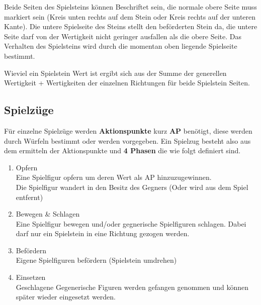 \documentclass{article}
\begin{document}
    \begin{flushleft}
    
    Beide Seiten des Spielsteins können Beschriftet sein, die normale obere Seite muss 
    markiert sein (Kreis unten rechts auf dem Stein oder Kreis rechts auf der unteren Kante).
	Die untere Spielseite des Steins stellt den beförderten Stein da, die untere Seite darf 
	von der Wertigkeit nicht geringer ausfallen als die obere Seite.
	Das Verhalten des Spielsteins wird durch die momentan oben liegende Spielseite bestimmt.
	
	
	Wieviel ein Spielstein Wert ist ergibt sich aus der Summe der generellen Wertigkeit + Wertigkeiten der einzelnen Richtungen für beide Spielstein Seiten.
	\end{flushleft}
	
	
\subsection{Spielzüge}

	Für einzelne Spielzüge werden \textbf{Aktionspunkte }kurz \textbf{AP} benötigt, diese werden durch Würfeln bestimmt oder werden vorgegeben.
	Ein Spielzug besteht also aus dem ermitteln der Aktionspunkte und \textbf{4 Phasen} die wie folgt definiert sind.
	\begin{enumerate}
	\item Opfern \\
		  Eine Spielfigur opfern um deren Wert als AP hinzuzugewinnen.\\
		  Die Spielfigur wandert in den Besitz des Gegners (Oder wird aus dem Spiel entfernt)
	\item Bewegen \& Schlagen \\
		  Eine Spielfigur bewegen und/oder gegnerische Spielfiguren schlagen. Dabei darf nur
		  ein Spielstein in eine Richtung gezogen werden.
	\item Befördern \\
		  Eigene Spielfiguren befördern (Spielstein umdrehen)
	\item Einsetzen \\
		  Geschlagene Gegenerische Figuren werden gefangen genommen und können später
		  wieder eingesetzt werden.
	\end{enumerate}
\end{document}
